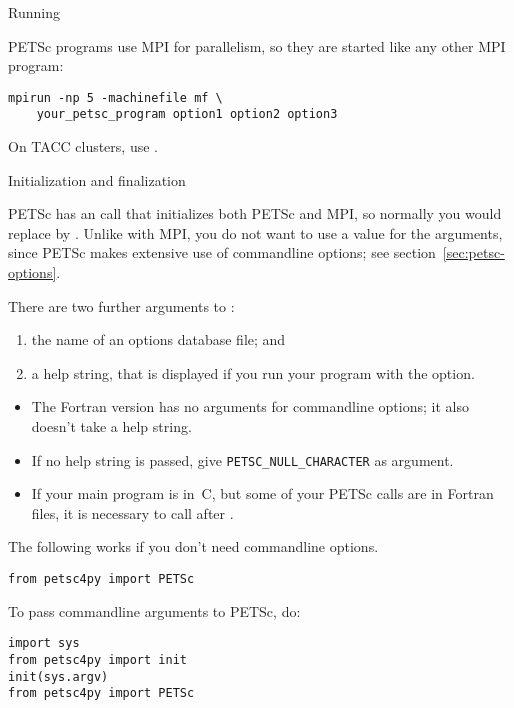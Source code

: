 {Running}

PETSc programs use MPI for parallelism, so they are started like any other
MPI program:
\begin{verbatim}
mpirun -np 5 -machinefile mf \
    your_petsc_program option1 option2 option3
\end{verbatim}
\begin{taccnote}
  On TACC clusters, use .
\end{taccnote}

 {Initialization and finalization}
\label{sec:petscinit}

PETSc has an call that initializes both PETSc and MPI, so normally you
would replace \indexmpishow{MPI_Init} by
.
Unlike with MPI, you do not want to
use a  value for the  arguments, since PETSc
makes extensive use of commandline options; see
section~\ref{sec:petsc-options}.


There are two further arguments to :
\begin{enumerate}
\item the name of an options database file; and
\item a help string, that is displayed if you run your program with the  option.
\end{enumerate}


\begin{fortrannote}
  \begin{itemize}
  \item
    The Fortran version has no arguments for commandline options;
    it also doesn't take a help string.
  \item If no help string is passed, give \lstinline{PETSC_NULL_CHARACTER} as argument.
  \item If your main program is in~C, but some of your PETSc calls are
    in Fortran files, it is necessary to call
     after
    .
  \end{itemize}
\end{fortrannote}

\begin{pythonnote}
  The following works if you don't need commandline options.
\begin{verbatim}
from petsc4py import PETSc
\end{verbatim}
To pass commandline arguments to PETSc, do:
\begin{verbatim}
import sys
from petsc4py import init
init(sys.argv)
from petsc4py import PETSc
\end{verbatim}
\end{pythonnote}

